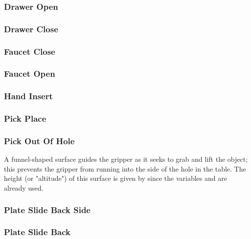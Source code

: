 {\subsubsection{Drawer Open}


\subsubsection{Drawer Close}


\subsubsection{Faucet Close}



\subsubsection{Faucet Open}



\subsubsection{Hand Insert}




\subsubsection{Pick Place}




\subsubsection{Pick Out Of Hole}
A funnel-shaped surface guides the gripper as it seeks to grab and lift the object; this prevents the gripper from running into the side of the hole in the table. The height (or "altitude") of this surface is given by  since the variables  and  are already used.




\subsubsection{Plate Slide Back Side}



\subsubsection{Plate Slide Back}



}
